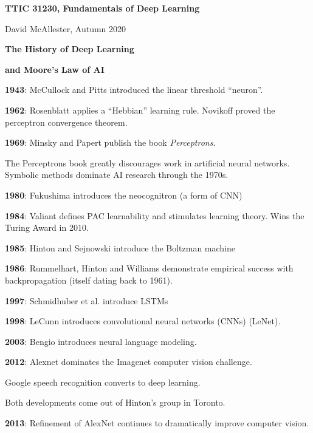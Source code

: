 




{\Huge
  \centerline{\bf TTIC 31230,  Fundamentals of Deep Learning}
  \vfill
  \centerline{David McAllester, Autumn 2020}
  \vfill
  \centerline{\bf The History of Deep Learning}
  \vfill
  \centerline{\bf  and Moore's Law of AI}

\vfill
\vfill


{\bf 1943}: McCullock and Pitts introduced the linear threshold ``neuron''.

\vfill
{\bf 1962}: Rosenblatt applies a ``Hebbian'' learning rule.  Novikoff proved the perceptron convergence theorem.

\vfill
{\bf 1969}: Minsky and Papert publish the book {\it Perceptrons}.

\vfill
The Perceptrons book greatly discourages work in artificial neural networks.  Symbolic methods dominate AI research through the 1970s.


{\bf 1980}: Fukushima introduces the neocognitron (a form of CNN)

\vfill
{\bf 1984}: Valiant defines PAC learnability and stimulates learning theory. Wins the Turing Award in 2010.

\vfill
{\bf 1985}: Hinton and Sejnowski introduce the Boltzman machine

\vfill
{\bf 1986}: Rummelhart, Hinton and Williams demonstrate empirical success with backpropagation (itself dating back to 1961).


{\bf 1997}: Schmidhuber et al. introduce LSTMs

\vfill
{\bf 1998}: LeCunn introduces convolutional neural networks (CNNs) (LeNet).

\vfill
{\bf 2003}: Bengio introduces neural language modeling.


{\bf 2012}: Alexnet dominates the Imagenet computer vision challenge.

\vfill
Google speech recognition converts to deep learning.

\vfill
Both developments come out of Hinton's group in Toronto.

\vfill
{\bf 2013}: Refinement of AlexNet continues to dramatically improve computer vision.

}
